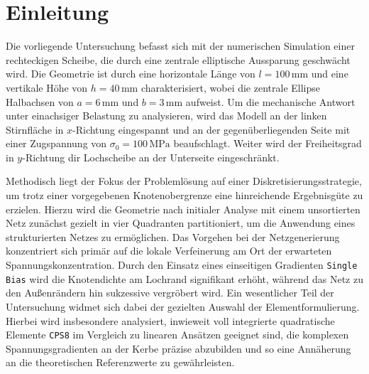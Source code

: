 \chapter{Einleitung}
\label{sec:Einleitung}

Die vorliegende Untersuchung befasst sich mit der numerischen Simulation einer rechteckigen Scheibe, die durch eine zentrale elliptische Aussparung geschwächt wird. Die Geometrie ist durch eine horizontale Länge von ${l = 100\,\mathrm{mm}}$ und eine vertikale Höhe von ${h = 40\,\mathrm{mm}}$ charakterisiert, wobei die zentrale Ellipse Halbachsen von ${a = 6\,\mathrm{mm}}$ und ${b = 3\,\mathrm{mm}}$ aufweist. Um die mechanische Antwort unter einachsiger Belastung zu analysieren, wird das Modell an der linken Stirnfläche in ${x}$-Richtung eingespannt und an der gegenüberliegenden Seite mit einer Zugspannung von ${\sigma_0 = 100\,\mathrm{MPa}}$ beaufschlagt. Weiter wird der Freiheitsgrad in ${y}$-Richtung dir Lochscheibe an der Unterseite eingeschränkt.

Methodisch liegt der Fokus der Problemlösung auf einer Diskretisierungsstrategie, um trotz einer vorgegebenen Knotenobergrenze eine hinreichende Ergebnisgüte zu erzielen. Hierzu wird die Geometrie nach initialer Analyse mit einem unsortierten Netz zunächst gezielt in vier Quadranten partitioniert, um die Anwendung eines strukturierten Netzes zu ermöglichen. Das Vorgehen bei der Netzgenerierung konzentriert sich primär auf die lokale Verfeinerung am Ort der erwarteten Spannungskonzentration. Durch den Einsatz eines einseitigen Gradienten \texttt{Single Bias} wird die Knotendichte am Lochrand signifikant erhöht, während das Netz zu den Außenrändern hin sukzessive vergröbert wird. Ein wesentlicher Teil der Untersuchung widmet sich dabei der gezielten Auswahl der Elementformulierung. Hierbei wird insbesondere analysiert, inwieweit voll integrierte quadratische Elemente \texttt{CPS8} im Vergleich zu linearen Ansätzen geeignet sind, die komplexen Spannungsgradienten an der Kerbe präzise abzubilden und so eine Annäherung an die theoretischen Referenzwerte zu gewährleisten.